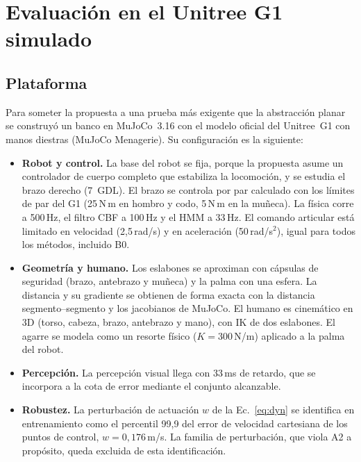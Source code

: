 \section{Evaluación en el Unitree G1 simulado}
\label{sec:g1}

\subsection{Plataforma}
\label{sec:g1:platform}
Para someter la propuesta a una prueba más exigente que la abstracción planar se construyó
un banco en MuJoCo~3.16 con el modelo oficial del Unitree~G1 con manos diestras (MuJoCo
Menagerie). Su configuración es la siguiente:
\begin{itemize}
\item \textbf{Robot y control.} La base del robot se fija, porque la propuesta asume un controlador de cuerpo completo que
estabiliza la locomoción, y se estudia el brazo derecho (7~GDL). El brazo se controla por par
calculado con los límites de par del G1 (25\,N\,m en hombro y codo, 5\,N\,m en la muñeca). La física corre a 500\,Hz,
el filtro CBF a 100\,Hz y el HMM a 33\,Hz. El comando articular está limitado en velocidad (2{,}5\,rad/s) y en
aceleración (50\,rad/s$^2$), igual para todos los métodos, incluido B0.
\item \textbf{Geometría y humano.} Los eslabones se aproximan con cápsulas de seguridad
(brazo, antebrazo y muñeca) y la palma con una esfera. La distancia y su gradiente se obtienen de forma exacta
con la distancia segmento--segmento y los jacobianos de MuJoCo. El humano es cinemático en 3D (torso,
cabeza, brazo, antebrazo y mano), con IK de dos eslabones. El agarre se modela como un resorte
físico ($K=300$\,N/m) aplicado a la palma del robot.
\item \textbf{Percepción.} La percepción visual llega con 33\,ms de retardo, que se
incorpora a la cota de error mediante el conjunto alcanzable.
\item \textbf{Robustez.} La perturbación de actuación $w$ de la Ec.~\eqref{eq:dyn} se identifica en
entrenamiento como el percentil 99{,}9 del error de velocidad cartesiana de los puntos de control,
$w=0{,}176$\,m/s. La familia de perturbación, que viola A2 a propósito, queda excluida de esta identificación.
\end{itemize}


